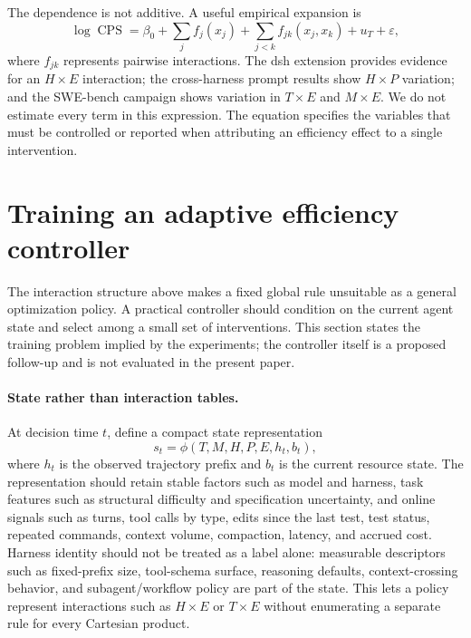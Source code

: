 \documentclass[11pt]{article}
\begin{document}
The dependence is not additive. A useful empirical expansion is
\[
\log \operatorname{CPS}
=\beta_0+\sum_j f_j(x_j)+\sum_{j<k}f_{jk}(x_j,x_k)+u_T+\varepsilon,
\]
where $f_{jk}$ represents pairwise interactions. The dsh extension provides
evidence for an $H\!\times\!E$ interaction; the cross-harness prompt results
show $H\!\times\!P$ variation; and the SWE-bench campaign shows variation in
$T\!\times\!E$ and $M\!\times\!E$. We do not estimate every term in this
expression. The equation specifies the variables that must be controlled or
reported when attributing an efficiency effect to a single intervention.

\section{Training an adaptive efficiency controller}
\label{sec:controller-training}
The interaction structure above makes a fixed global rule unsuitable as a
general optimization policy. A practical controller should condition on the
current agent state and select among a small set of interventions. This section
states the training problem implied by the experiments; the controller itself
is a proposed follow-up and is not evaluated in the present paper.

\paragraph{State rather than interaction tables.}
At decision time $t$, define a compact state representation
\[
s_t=\phi(T,M,H,P,E,h_t,b_t),
\]
where $h_t$ is the observed trajectory prefix and $b_t$ is the current resource
state. The representation should retain stable factors such as model and
harness, task features such as structural difficulty and specification
uncertainty, and online signals such as turns, tool calls by type, edits since
the last test, test status, repeated commands, context volume, compaction,
latency, and accrued cost. Harness identity should not be treated as a label
alone: measurable descriptors such as fixed-prefix size, tool-schema surface,
reasoning defaults, context-crossing behavior, and subagent/workflow policy are
part of the state. This lets a policy represent interactions such as
$H\!\times\!E$ or $T\!\times\!E$ without enumerating a separate rule for
every Cartesian product.
\end{document}
